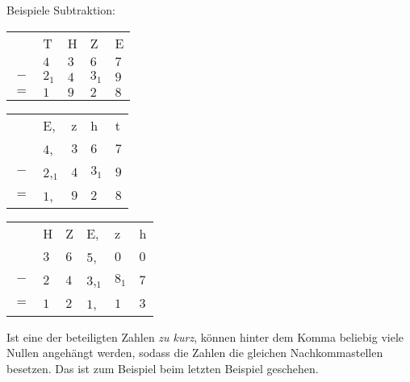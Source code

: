 Beispiele Subtraktion:\\
\begin{tabular}{cllll}
	& T     & H   & Z     & E   \\
	& $4$   & $3$ & $6$   & $7$ \\
	$-$ & $2_1$ & $4$ & $3_1$ & $9$ \\ \hline
	$=$ & $1$   & $9$ & $2$   & $8$
\end{tabular}
%
\hfill
%
\begin{tabular}{cllll}
	& E,       & z   & h     & t   \\
	& $4$,     & $3$ & $6$   & $7$ \\
	$-$ & $2$,$_1$ & $4$ & $3_1$ & $9$ \\ \hline
	$=$ & $1$,     & $9$ & $2$   & $8$
\end{tabular}
%
\hfill
%
\begin{tabular}{clllll}
	& H     & Z   & E,       & z     & h   \\
	& $3$   & $6$ & $5$,     & $0$   & $0$ \\
	$-$ & $2$ & $4$ & $3$,$_1$ & $8_1$ & $7$ \\ \hline
	$=$  & $1$   & $2$ & $1$,     & $1$   & $3$
\end{tabular}

Ist eine der beteiligten Zahlen \emph{zu kurz}, können hinter dem Komma beliebig viele Nullen angehängt werden, sodass die Zahlen die gleichen Nachkommastellen besetzen. Das ist zum Beispiel beim letzten Beispiel geschehen.